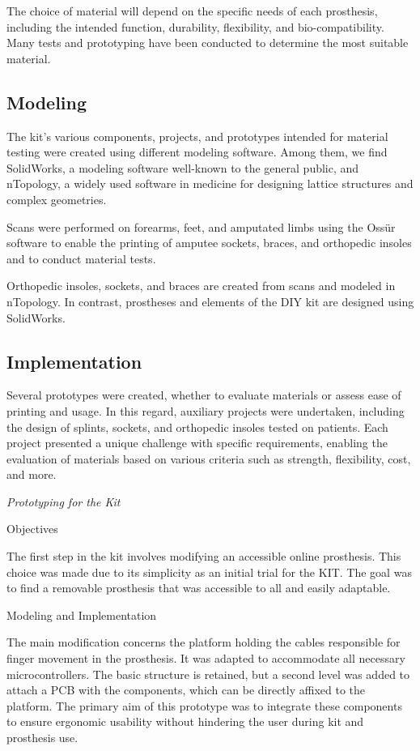 The choice of material will depend on the specific needs of each prosthesis, including the intended function, durability, flexibility, and bio-compatibility. Many tests and prototyping have been conducted to determine the most suitable material.

\subsection{Modeling}

The kit’s various components, projects, and prototypes intended for material testing were created using different modeling software. Among them, we find SolidWorks, a modeling software well-known to the general public, and nTopology, a widely used software in medicine for designing lattice structures and complex geometries.

Scans were performed on forearms, feet, and amputated limbs using the Ossür software to enable the printing of amputee sockets, braces, and orthopedic insoles and to conduct material tests.

Orthopedic insoles, sockets, and braces are created from scans and modeled in nTopology. In contrast, prostheses and elements of the DIY kit are designed using SolidWorks.

\subsection{Implementation}

Several prototypes were created, whether to evaluate materials or assess ease of printing and usage. In this regard, auxiliary projects were undertaken, including the design of splints, sockets, and orthopedic insoles tested on patients. Each project presented a unique challenge with specific requirements, enabling the evaluation of materials based on various criteria such as strength, flexibility, cost, and more.

\textit{Prototyping for the Kit}
\item Objectives

The first step in the kit involves modifying an accessible online prosthesis. This choice was made due to its simplicity as an initial trial for the KIT. The goal was to find a removable prosthesis that was accessible to all and easily adaptable.

\item Modeling and Implementation

The main modification concerns the platform holding the cables responsible for finger movement in the prosthesis. It was adapted to accommodate all necessary microcontrollers. The basic structure is retained, but a second level was added to attach a PCB with the components, which can be directly affixed to the platform. The primary aim of this prototype was to integrate these components to ensure ergonomic usability without hindering the user during kit and prosthesis use.

